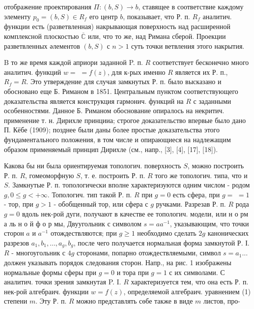 \documentclass[10pt]{article}
\begin{document}
отображение проектирования $\Pi:(b, S) \rightarrow b$, ставящее в соответствие каждому элементу $p_{0}=(b, S) \in R_{f}$ его центр $b$, показывает, что Р. п. $R_{f}$ аналитич. функции есть (разветвленная) накрывающая поверхность над расширенной комплексной плоскостью $\overline{\mathbb{C}}$ или, что то же, над Римана сберой. Проекции разветвленных әлементов $(b, S)$ с $n>1$ суть точки ветвления этого накрытия.



B то же время каждой априори заданной P. п. $R$ соответствует бесконечно много аналитич. функций $w=$ $=f(z)$, для к-рых именно $R$ является их Р. п., $R_{f}=R$. Это утверждение для случая замкнутых Р. п. было высказано и обосновано еще Б. Риманом в 1851. Центральным пунктом соответствующего доказательства является конструкция гармонич. функций на $R$ с заданными особенностями. Данное Б. Риманом обоснование опиралось на некритич. применение т. н. Дирихле принцииа; строгое доказательство впервые было дано П. Кёбе (1909); позднее были даны более простые доказательства этого фундаментального положения, в том числе и опирающиеся на надлежащим образом применяемый принцип Дирихле (см., напр., [3], [4], [17], [18]).



Какова бы ни была ориентируемая топологич. поверхность $S$, можно построить Р. п. $R$, гомеоморфную $S$, т. е. построить Р. п. $R$ того же топологич. типа, что и $S$. Замкнутые Р. п. топологически вполне характеризуются одним числом - родом $g, 0 \leqslant g<+\infty$. Топологич. тип такой Р. п. $R$ при $g=0$ есть сфера, при $g=$ $=1$ - тор, при $g>1$ - обобщенный тор, или сфера с $g$ ручками. Разрезав Р. п. $R$ рода $g=0$ вдоль нек-рой дуги, получают в качестве ее топологич. модели, или н о рм а ль н о й ф о р мы, Двуугольник с символом $s=a a^{-1}$, указывающим, что точки сторон $a$ и $a^{-1}$ отождествляются; при $g \geqslant 1$ необходимо сделать $2 g$ канонических разрезов $a_{1}, b_{1}, \ldots, a_{g}, b_{g}$, после чего получается нормальная форма замкнутой Р. І. $R$ - многоугольник с $4 g$ сторонами, попарно отождествляемыми, символ $s=a_{1} \ldots$ должен указывать порядок следования сторон. Напр., на рис. 1 изображены нормальные формы сферы при $g=0$ и тора при $g=1$ с их символами. С аналитич. точки зрения замкнутая P. I. $R$ характеризуется тем, что она есть Р. п. нек-рой алгебраич. функции $w=f(z)$, определяемой алгебраич. уравнением (1) степени $m$. Эту Р. п. $R$ можно представлять сөбе также в виде $m$ листов, про-
\end{document}
